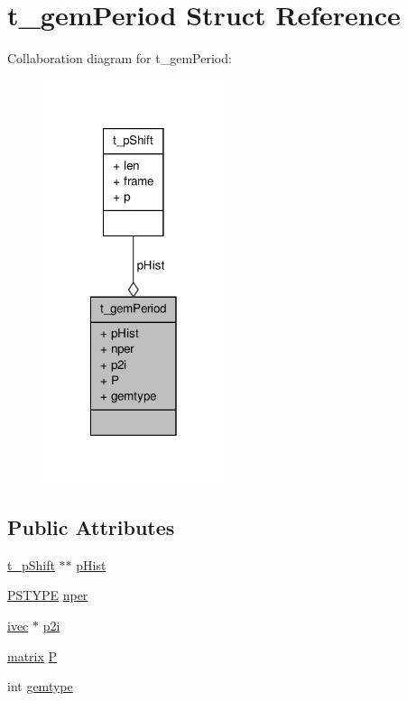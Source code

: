 \hypertarget{structt__gemPeriod}{\section{t\-\_\-gem\-Period \-Struct \-Reference}
\label{structt__gemPeriod}
}


\-Collaboration diagram for t\-\_\-gem\-Period\-:
\nopagebreak
\begin{figure}[H]
\begin{center}
\leavevmode
\includegraphics[width=150pt]{structt__gemPeriod__coll__graph}
\end{center}
\end{figure}
\subsection*{\-Public \-Attributes}
\begin{DoxyCompactItemize}
\item 
\hyperlink{structt__pShift}{t\-\_\-p\-Shift} $\ast$$\ast$ \hyperlink{structt__gemPeriod_a15c29bc306427460c3b3e91a0f68d69c}{p\-Hist}
\item 
\hyperlink{gmx__hbond_8c_a098dc5fca1c0d52294fea24565555b87}{\-P\-S\-T\-Y\-P\-E} \hyperlink{structt__gemPeriod_aae90d510ff9b4db70fe819303d1ba08b}{nper}
\item 
\hyperlink{share_2template_2gromacs_2types_2simple_8h_a74f6ffdb4a9c1764f5293969d8c681b6}{ivec} $\ast$ \hyperlink{structt__gemPeriod_ac5e508a6c5359bca692c6e8925ac5043}{p2i}
\item 
\hyperlink{share_2template_2gromacs_2types_2simple_8h_a7ea9c2a830d3f743b887387e33645a83}{matrix} \hyperlink{structt__gemPeriod_aba08a8101bfee729edd8218d11d00793}{\-P}
\item 
int \hyperlink{structt__gemPeriod_a4545f8bfdeb4198ad29950e5ef3bd95a}{gemtype}
\end{DoxyCompactItemize}


